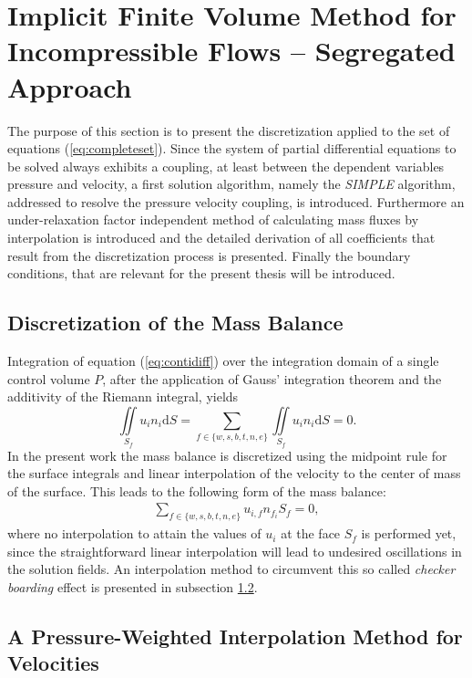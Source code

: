 \section{Implicit Finite Volume Method for Incompressible Flows -- Segregated Approach}
\label{sec:seg}

  The purpose of this section is to present the discretization applied to the set of equations (\ref{eq:completeset}). Since the system of partial differential equations to be solved always exhibits a coupling, at least between the dependent variables pressure and velocity, a first solution algorithm, namely the \emph{SIMPLE} algorithm, addressed to resolve the pressure velocity coupling, is introduced. Furthermore an under-relaxation factor independent method of calculating mass fluxes by interpolation is introduced and the detailed derivation of all coefficients that result from the discretization process is presented. Finally the boundary conditions, that are relevant for the present thesis will be introduced.

\subsection{Discretization of the Mass Balance}

Integration of equation (\ref{eq:contidiff}) over the integration domain of a single control volume \(P\), after the application of Gauss' integration theorem and the additivity of the Riemann integral, yields
\begin{displaymath}
  \iint\limits_{S_f} u_i n_i \mathrm{d}S = \sum_{f \in \{w,s,b,t,n,e\}} \iint\limits_{S_f} u_i n_{i} \mathrm{d}S = 0.
\end{displaymath}
In the present work the mass balance is discretized using the midpoint rule for the surface integrals and linear interpolation of the velocity to the center of mass of the surface. This leads to the following form of the mass balance:
\begin{align}
  \label{eq:massbalance}
\sum_{f \in \{w,s,b,t,n,e\}} u_{i,f} n_{f_i} S_f = 0,
\end{align}
where no interpolation to attain the values of \(u_i\) at the face \(S_f\) is performed yet, since the straightforward linear interpolation will lead to undesired oscillations in the solution fields. An interpolation method to circumvent this so called \emph{checker boarding} effect is presented in subsection \ref{sec:massflux}.

\subsection{A Pressure-Weighted Interpolation Method for Velocities}
\label{sec:massflux}

